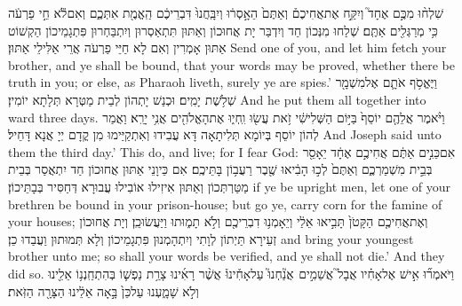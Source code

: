 {שִׁלְח֨וּ מִכֶּ֣ם אֶחָד֮ וְיִקַּ֣ח אֶת\maqqaf אֲחִיכֶם֒ וְאַתֶּם֙ הֵאָ֣סְר֔וּ וְיִבָּֽחֲנוּ֙ דִּבְרֵיכֶ֔ם הַֽאֱמֶ֖ת אִתְּכֶ֑ם וְאִם\maqqaf לֹ֕א חֵ֣י פַרְעֹ֔ה כִּ֥י מְרַגְּלִ֖ים אַתֶּֽם׃}
{שְׁלַחוּ מִנְּכוֹן חַד וְיִדְבַּר יָת אֲחוּכוֹן וְאַתּוּן תִּתְאַסְרוּן וְיִתְבַּחְרוּן פִּתְגָמֵיכוֹן הַקְשׁוֹט אַתּוּן אָמְרִין וְאִם לָא חַיֵּי פַרְעֹה אֲרֵי אַלִּילֵי אַתּוּן׃}
{Send one of you, and let him fetch your brother, and ye shall be bound, that your words may be proved, whether there be truth in you; or else, as Pharaoh liveth, surely ye are spies.’}{}
{וַיֶּאֱסֹ֥ף אֹתָ֛ם אֶל\maqqaf מִשְׁמָ֖ר שְׁלֹ֥שֶׁת יָמִֽים׃}
{וּכְנַשׁ יָתְהוֹן לְבֵית מַטְּרָא תְּלָתָא יוֹמִין׃}
{And he put them all together into ward three days.}{}
{וַיֹּ֨אמֶר אֲלֵהֶ֤ם יוֹסֵף֙ בַּיּ֣וֹם הַשְּׁלִישִׁ֔י זֹ֥את עֲשׂ֖וּ וִֽחְי֑וּ אֶת\maqqaf הָאֱלֹהִ֖ים אֲנִ֥י יָרֵֽא׃}
{וַאֲמַר לְהוֹן יוֹסֵף בְּיוֹמָא תְּלִיתָאָה דָּא עֲבִידוּ וְאִתְקַיַּימוּ מִן קֳדָם יְיָ אֲנָא דָּחֵיל׃}
{And Joseph said unto them the third day.’ This do, and live; for I fear God:}{}
{אִם\maqqaf כֵּנִ֣ים אַתֶּ֔ם אֲחִיכֶ֣ם אֶחָ֔ד יֵאָסֵ֖ר בְּבֵ֣ית מִשְׁמַרְכֶ֑ם וְאַתֶּם֙ לְכ֣וּ הָבִ֔יאוּ שֶׁ֖בֶר רַעֲב֥וֹן בָּתֵּיכֶֽם׃}
{אִם כֵּיוָנֵי אַתּוּן אֲחוּכוֹן חַד יִתְאֲסַר בְּבֵית מַטַּרְתְּכוֹן וְאַתּוּן אִיזִילוּ אוֹבִילוּ עֲבוּרָא דְּחַסִּיר בְּבָתֵּיכוֹן׃}
{if ye be upright men, let one of your brethren be bound in your prison-house; but go ye, carry corn for the famine of your houses;}{}
{וְאֶת\maqqaf אֲחִיכֶ֤ם הַקָּטֹן֙ תָּבִ֣יאוּ אֵלַ֔י וְיֵאָמְנ֥וּ דִבְרֵיכֶ֖ם וְלֹ֣א תָמ֑וּתוּ וַיַּעֲשׂוּ\maqqaf כֵֽן׃}
{וְיָת אֲחוּכוֹן זְעֵירָא תַּיְתוֹן לְוָתִי וְיִתְהָמְנוּן פִּתְגָמֵיכוֹן וְלָא תְּמוּתוּן וַעֲבַדוּ כֵן׃}
{and bring your youngest brother unto me; so shall your words be verified, and ye shall not die.’ And they did so.}{}
{וַיֹּאמְר֞וּ אִ֣ישׁ אֶל\maqqaf אָחִ֗יו אֲבָל֮ אֲשֵׁמִ֣ים \pasek  אֲנַ֘חְנוּ֮ עַל\maqqaf אָחִ֒ינוּ֒ אֲשֶׁ֨ר רָאִ֜ינוּ צָרַ֥ת נַפְשׁ֛וֹ בְּהִתְחַֽנְנ֥וֹ אֵלֵ֖ינוּ וְלֹ֣א שָׁמָ֑עְנוּ עַל\maqqaf כֵּן֙ בָּ֣אָה אֵלֵ֔ינוּ הַצָּרָ֖ה הַזֹּֽאת׃}
